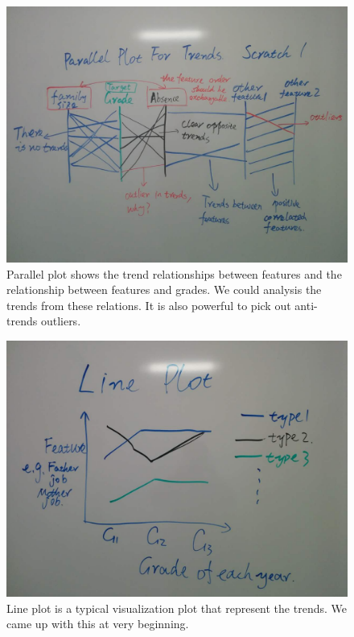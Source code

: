 \documentclass{article}
\begin{document}
\begin{figure}[H]
\centering
\includegraphics[scale=0.23]{parallel_plot.jpg}
\caption{Parallel plot shows the trend relationships between features and the relationship between features and grades. We could analysis the trends from these relations. It is also powerful to pick out anti-trends outliers.}
\end{figure}

\begin{figure}[H]
\centering
\includegraphics[scale=0.23]{line_plot.jpg}
\caption{Line plot is a typical visualization plot that represent the trends. We came up with this at very beginning.}
\end{figure}
\end{document}
